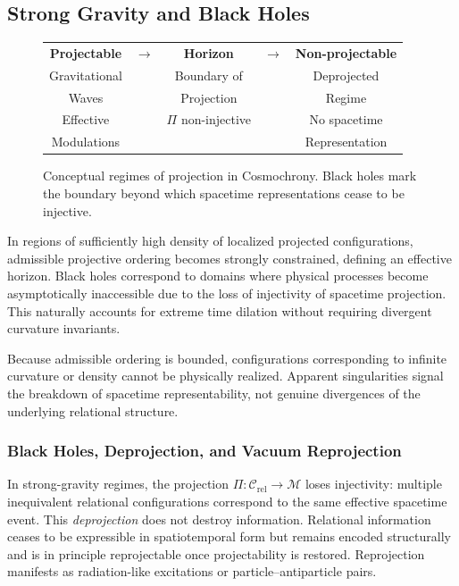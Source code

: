 \subsection{Strong Gravity and Black Holes}
  \label{subsec:strong-gravity-and-black-holes}

  \begin{figure}[h]
    \centering
    \begin{tabular}{c c c c c}
      \textbf{Projectable} &
      $\rightarrow$ &
      \textbf{Horizon} &
      $\rightarrow$ &
      \textbf{Non-projectable} \\[6pt]
      Gravitational & & Boundary of         & & Deprojected    \\
      Waves         & & Projection          & & Regime \\[6pt]
      Effective     & & $\Pi$ non-injective & & No spacetime   \\
      Modulations   & &                     & & Representation
    \end{tabular}
    \caption{Conceptual regimes of projection in Cosmochrony.
    Black holes mark the boundary beyond which spacetime
    representations cease to be injective.}
    \label{fig:chi_projection_regimes}
  \end{figure}

  In regions of sufficiently high density of localized projected
  configurations, admissible projective ordering becomes strongly constrained,
  defining an effective horizon.
  Black holes correspond to domains where physical processes become
  asymptotically inaccessible due to the loss of injectivity of spacetime
  projection.
  This naturally accounts for extreme time dilation without requiring
  divergent curvature invariants.

  Because admissible ordering is bounded, configurations corresponding to
  infinite curvature or density cannot be physically realized.
  Apparent singularities signal the breakdown of spacetime
  representability, not genuine divergences of the underlying relational
  structure.

  \subsubsection*{Black Holes, Deprojection, and Vacuum Reprojection}
    \label{subsec:black-hole-deprojection-cycle}

    In strong-gravity regimes, the projection
    $\Pi : \mathcal{C}_{\mathrm{rel}} \longrightarrow \mathcal{M}$
    loses injectivity: multiple inequivalent relational configurations
    correspond to the same effective spacetime event.
    This \emph{deprojection} does not destroy information.
    Relational information ceases to be expressible in spatiotemporal form
    but remains encoded structurally and is in principle reprojectable once
    projectability is restored.
    Reprojection manifests as radiation-like excitations or
    particle--antiparticle pairs.

